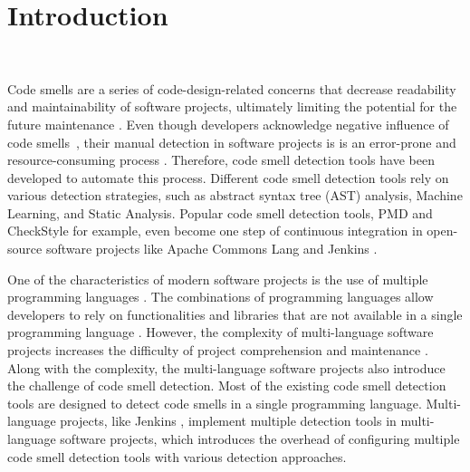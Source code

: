 \section{Introduction}~\label{sec:introduction}


Code smells are a series of code-design-related concerns that decrease
readability \cite{5741260} and maintainability \cite{6392174,6405287} of
software projects, ultimately limiting the potential for the future maintenance
\cite{Fowler_Beck}. Even though developers acknowledge negative influence of
code smells~\cite{developersCare}, their manual detection in software projects
is is an error-prone and resource-consuming process
\cite{DetectingDefectsInObject}. Therefore, code smell detection tools have been
developed to automate this process. Different code smell detection tools rely on
various detection strategies, such as abstract syntax tree (AST) analysis,
Machine Learning, and Static Analysis. Popular code smell detection tools, PMD
\cite{PMD} and CheckStyle \cite{CheckStyle} for example, even become one step of
continuous integration in open-source software projects like Apache Commons Lang
\cite{ApacheCommonsLang} and Jenkins \cite{Jekins}.

One of the characteristics of modern software projects is the use of multiple
programming languages \cite{723183}. The combinations of programming languages
allow developers to rely on functionalities and libraries that are not available
in a single programming language \cite{7476675}. However, the complexity of
multi-language software projects increases the difficulty of project
comprehension and maintenance \cite{7476675, 10.1109/SCAM.2012.11, 7396422}.
Along with the complexity, the multi-language software projects also introduce
the challenge of code smell detection. Most of the existing code smell detection
tools are designed to detect code smells in a single programming language.
Multi-language projects, like Jenkins \cite{Jekins}, implement multiple
detection tools in multi-language software projects, which introduces the
overhead of configuring multiple code smell detection tools with various
detection approaches.

